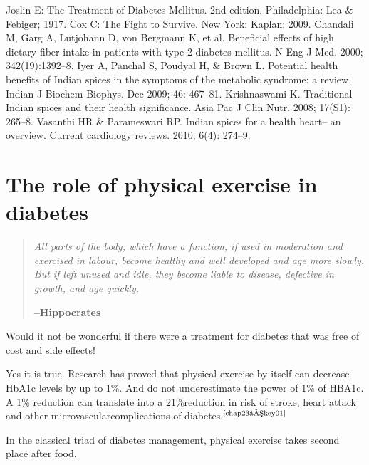 \begin{thebibliography}{99}
 Joslin E: The Treatment of Diabetes Mellitus. 2nd edition. Phila\-delphia: Lea \& Febiger; 1917.
 Cox C: The Fight to Survive. New York: Kaplan; 2009.
 Chandali M, Garg A, Lutjohann D, von Bergmann K, et al. Beneficial effects of high dietary fiber intake in patients with type 2 diabetes mellitus. N Eng J Med. 2000; 342(19):1392–8.
 Iyer A, Panchal S, Poudyal H, \& Brown L. Potential health benefits of Indian spices in the symptoms of the metabolic syndrome: a review. Indian J Biochem Biophys. Dec 2009; 46: 467–81.
 Krishnaswami K. Traditional Indian spices and their health signi\-ficance. Asia Pac J Clin Nutr. 2008; 17(S1): 265–8.
 Vasanthi HR \& Parameswari RP. Indian spices for a health heart– an overview. Current cardiology reviews. 2010; 6(4): 274–9.
\end{thebibliography}


\chapter{The role of physical exercise in diabetes}\label{chap23}

\begin{quote}
\textit{All parts of the body, which have a function, if used in moderation and exercised in labour, become healthy and well developed and age more slowly. But if left unused and idle, they become liable to disease, defective in growth, and age quickly.}
\begin{flushright}
\textbf{–Hippocrates}
\end{flushright}
\end{quote}

Would it not be wonderful if there were a treatment for diabetes that was free of cost and side effects!

Yes it is true. Research has proved that physical exercise by it\-self can decrease HbA1c levels by up to 1\%. And do not underestimate the power of 1\% of HBA1c. A 1\% reduction can translate into a 21\%\break reduction in risk of stroke, heart attack and other microvascular\break complications of diabetes.$^{\text{\cite{chap23–key01}}}$

In the classical triad of diabetes management, physical exercise takes second place after food.


